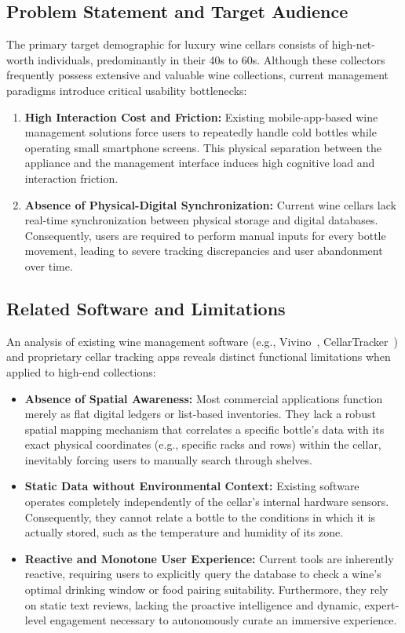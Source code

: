 \documentclass[conference]{IEEEtran}
\begin{document}
\subsection{Problem Statement and Target Audience}
The primary target demographic for luxury wine cellars consists of high-net-worth individuals, predominantly in their 40s to 60s. Although these collectors frequently possess extensive and valuable wine collections, current management paradigms introduce critical usability bottlenecks:
\begin{enumerate}
    \item \textbf{High Interaction Cost and Friction:} Existing mobile-app-based wine management solutions force users to repeatedly handle cold bottles while operating small smartphone screens. This physical separation between the appliance and the management interface induces high cognitive load and interaction friction.
    \item \textbf{Absence of Physical-Digital Synchronization:} Current wine cellars lack real-time synchronization between physical storage and digital databases. Consequently, users are required to perform manual inputs for every bottle movement, leading to severe tracking discrepancies and user abandonment over time.
\end{enumerate}

\subsection{Related Software and Limitations}
An analysis of existing wine management software (e.g., Vivino~\cite{vivino}, CellarTracker~\cite{cellartracker}) and proprietary cellar tracking apps reveals distinct functional limitations when applied to high-end collections:
\begin{itemize}
    \item \textbf{Absence of Spatial Awareness:} Most commercial applications function merely as flat digital ledgers or list-based inventories. They lack a robust spatial mapping mechanism that correlates a specific bottle's data with its exact physical coordinates (e.g., specific racks and rows) within the cellar, inevitably forcing users to manually search through shelves.
    \item \textbf{Static Data without Environmental Context:} Existing software operates completely independently of the cellar's internal hardware sensors. Consequently, they cannot relate a bottle to the conditions in which it is actually stored, such as the temperature and humidity of its zone.
    \item \textbf{Reactive and Monotone User Experience:} Current tools are inherently reactive, requiring users to explicitly query the database to check a wine's optimal drinking window or food pairing suitability. Furthermore, they rely on static text reviews, lacking the proactive intelligence and dynamic, expert-level engagement necessary to autonomously curate an immersive experience.
\end{itemize}
\end{document}
